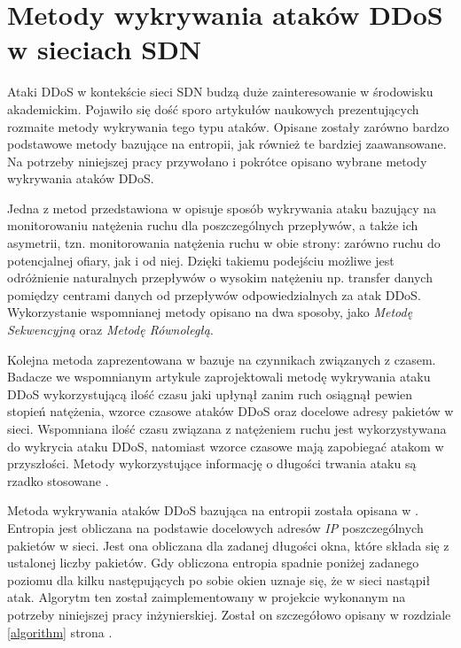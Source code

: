 \section{Metody wykrywania ataków DDoS w sieciach SDN}

Ataki DDoS w kontekście sieci SDN budzą duże zainteresowanie w środowisku
akademickim. Pojawiło się dość sporo artykułów naukowych prezentujących rozmaite
metody wykrywania tego typu ataków. Opisane zostały zarówno bardzo podstawowe
metody bazujące na entropii, jak również te bardziej zaawansowane. Na potrzeby
niniejszej pracy przywołano i pokrótce opisano wybrane metody wykrywania
ataków DDoS. 

Jedna z metod przedstawiona w \cite{ddosNYarticle} opisuje sposób wykrywania
ataku bazujący na monitorowaniu natężenia ruchu dla poszczególnych przepływów, a
także ich asymetrii, tzn. monitorowania natężenia ruchu w obie strony: zarówno
ruchu do potencjalnej ofiary, jak i od niej. Dzięki takiemu podejściu możliwe
jest odróżnienie naturalnych przepływów o wysokim natężeniu np. transfer danych
pomiędzy centrami danych od przepływów odpowiedzialnych za atak DDoS.
Wykorzystanie wspomnianej metody opisano na dwa sposoby, jako \textit{Metodę
  Sekwencyjną} oraz \textit{Metodę Równoległą}. 

Kolejna metoda zaprezentowana w \cite{ddoskoreaarticle} bazuje na czynnikach
związanych z czasem. Badacze we wspomnianym artykule zaprojektowali metodę
wykrywania ataku DDoS wykorzystującą ilość czasu jaki upłynął zanim ruch
osiągnął pewien stopień natężenia, wzorce czasowe ataków DDoS oraz docelowe
adresy pakietów w sieci. Wspomniana ilość czasu związana z natężeniem ruchu jest
wykorzystywana do wykrycia ataku DDoS, natomiast wzorce czasowe mają zapobiegać
atakom w przyszłości. Metody wykorzystujące informację o długości trwania ataku
są rzadko stosowane \cite{ddoskoreaarticle}. 

Metoda wykrywania ataków DDoS bazująca na entropii została opisana w
\cite{mainddosarticle}. Entropia jest obliczana na podstawie docelowych adresów
\textit{IP} poszczególnych pakietów w sieci. Jest ona obliczana dla zadanej
długości okna, które składa się z ustalonej liczby pakietów. Gdy obliczona
entropia spadnie poniżej zadanego poziomu dla kilku następujących po sobie okien
uznaje się, że w sieci nastąpił atak. Algorytm ten został zaimplementowany w
projekcie wykonanym na potrzeby niniejszej pracy inżynierskiej. Został on
szczegółowo opisany w rozdziale \ref{algorithm} strona \pageref{algorithm}.

